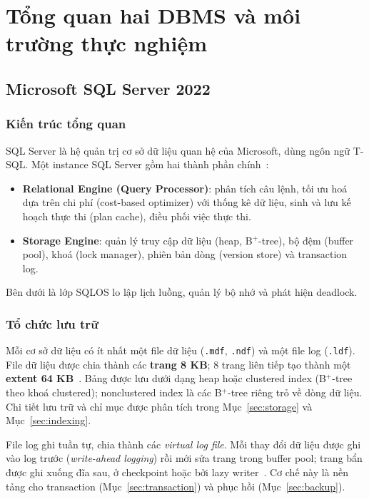 \section{Tổng quan hai DBMS và môi trường thực nghiệm}
\label{sec:background}

\subsection{Microsoft SQL Server 2022}

\subsubsection{Kiến trúc tổng quan}
SQL Server là hệ quản trị cơ sở dữ liệu quan hệ của Microsoft, dùng ngôn ngữ T-SQL. Một instance SQL Server gồm hai thành phần chính~\cite{silberschatz}:
\begin{itemize}
    \item \textbf{Relational Engine (Query Processor)}: phân tích câu lệnh, tối ưu hoá dựa trên chi phí (cost-based optimizer) với thống kê dữ liệu, sinh và lưu kế hoạch thực thi (plan cache), điều phối việc thực thi.
    \item \textbf{Storage Engine}: quản lý truy cập dữ liệu (heap, B$^+$-tree), bộ đệm (buffer pool), khoá (lock manager), phiên bản dòng (version store) và transaction log.
\end{itemize}
Bên dưới là lớp SQLOS lo lập lịch luồng, quản lý bộ nhớ và phát hiện deadlock.

\subsubsection{Tổ chức lưu trữ}
Mỗi cơ sở dữ liệu có ít nhất một file dữ liệu (\texttt{.mdf}, \texttt{.ndf}) và một file log (\texttt{.ldf}). File dữ liệu được chia thành các \textbf{trang 8 KB}; 8 trang liên tiếp tạo thành một \textbf{extent 64 KB}~\cite{mssql-pages}. Bảng được lưu dưới dạng heap hoặc clustered index (B$^+$-tree theo khoá clustered); nonclustered index là các B$^+$-tree riêng trỏ về dòng dữ liệu. Chi tiết lưu trữ và chỉ mục được phân tích trong Mục~\ref{sec:storage} và Mục~\ref{sec:indexing}.

File log ghi tuần tự, chia thành các \textit{virtual log file}. Mỗi thay đổi dữ liệu được ghi vào log trước (\textit{write-ahead logging}) rồi mới sửa trang trong buffer pool; trang bẩn được ghi xuống đĩa sau, ở checkpoint hoặc bởi lazy writer~\cite{mssql-txlog}. Cơ chế này là nền tảng cho transaction (Mục~\ref{sec:transaction}) và phục hồi (Mục~\ref{sec:backup}).

